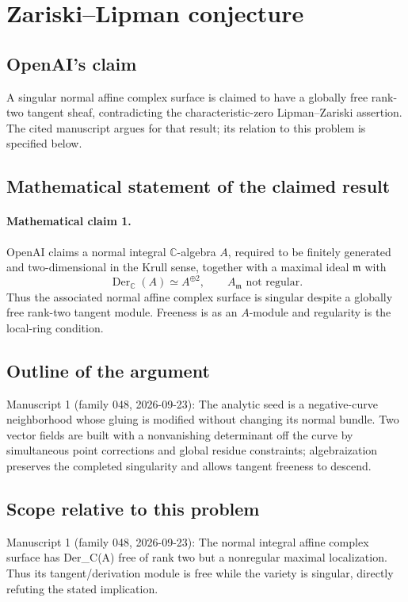 \documentclass[11pt]{article}
\begin{document}
\section*{Zariski–Lipman conjecture}

\subsection{OpenAI's claim}
A singular normal affine complex surface is claimed to have a globally free rank-two tangent sheaf, contradicting the characteristic-zero Lipman--Zariski assertion. The cited manuscript argues for that result; its relation to this problem is specified below.

\subsection{Mathematical statement of the claimed result}
\paragraph{Mathematical claim 1.} OpenAI claims a normal integral $\mathbb C$-algebra $A$, required to be finitely generated and two-dimensional in the Krull sense, together with a maximal ideal $\mathfrak m$ with
\[
\operatorname{Der}_{\mathbb C}(A)\simeq A^{\oplus2},\qquad A_{\mathfrak m}\text{ not regular}.
\]
Thus the associated normal affine complex surface is singular despite a globally free rank-two tangent module. Freeness is as an $A$-module and regularity is the local-ring condition.

\subsection{Outline of the argument}
Manuscript 1 (family 048, 2026-09-23): The analytic seed is a negative-curve neighborhood whose gluing is modified without changing its normal bundle. Two vector fields are built with a nonvanishing determinant off the curve by simultaneous point corrections and global residue constraints; algebraization preserves the completed singularity and allows tangent freeness to descend.

\subsection{Scope relative to this problem}
Manuscript 1 (family 048, 2026-09-23): The normal integral affine complex surface has Der\_C(A) free of rank two but a nonregular maximal localization. Thus its tangent/derivation module is free while the variety is singular, directly refuting the stated implication.
\end{document}
